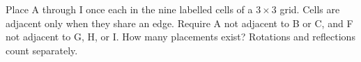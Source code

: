 Place A through I once each in the nine labelled cells of a $3\times3$ grid. Cells are adjacent only when they share an edge. Require A not adjacent to B or C, and F not adjacent to G, H, or I. How many placements exist? Rotations and reflections count separately.
